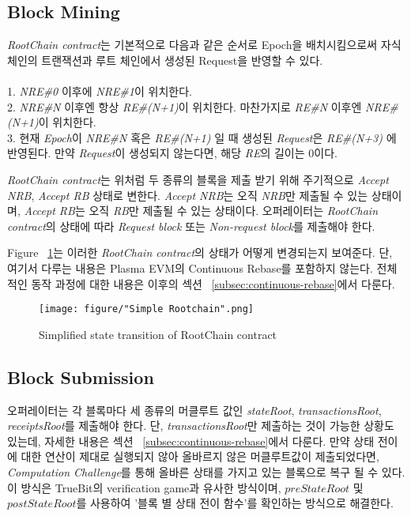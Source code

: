 \documentclass[letterpaper, 11pt]{article}
\begin{document}
\subsection{Block Mining} \label{subsec:blockmining}
\begin{CJK}{UTF8}{mj}
\emph{RootChain contract}는 기본적으로 다음과 같은 순서로 Epoch을 배치시킴으로써 자식 체인의 트랜잭션과 루트 체인에서 생성된 Request을 반영할 수 있다.\\
\\
1. \emph{NRE\#0} 이후에 \emph{NRE\#1}이 위치한다.\\
2. \emph{NRE\#N} 이후엔 항상 \emph{RE\#(N+1)}이 위치한다. 마찬가지로 \emph{RE\#N} 이후엔 \emph{NRE\#(N+1)}이 위치한다.\\
3. 현재 \emph{Epoch}이 \emph{NRE\#N} 혹은 \emph{RE\#(N+1)} 일 때 생성된 \emph{Request}은 \emph{RE\#(N+3)} 에 반영된다. 만약 \emph{Request}이 생성되지 않는다면, 해당 \emph{RE}의 길이는 0이다.

\bigskip

\emph{RootChain contract}는 위처럼 두 종류의 블록을 제출 받기 위해 주기적으로 \emph{Accept NRB}, \emph{Accept RB} 상태로 변한다. \emph{Accept NRB}는 오직 \emph{NRB}만 제출될 수 있는 상태이며, \emph{Accept RB}는 오직 \emph{RB}만 제출될 수 있는 상태이다. 오퍼레이터는 \emph{RootChain contract}의 상태에 따라 \emph{Request block} 또는 \emph{Non-request block}를 제출해야 한다.

Figure ~\ref{fig:simple-state-transition-diagram}는 이러한 \emph{RootChain contract}의 상태가 어떻게 변경되는지 보여준다. 단, 여기서 다루는 내용은 Plasma EVM의 Continuous Rebase를 포함하지 않는다. 전체적인 동작 과정에 대한 내용은 이후의 섹션 ~\ref{subsec:continuous-rebase}에서 다룬다.

\begin{figure}[!h]
\centering
\texttt{[image: figure/"Simple Rootchain".png]}
\caption{Simplified state transition of RootChain contract}
\label{fig:simple-state-transition-diagram}
\end{figure}

\end{CJK}

\subsection{Block Submission}
\begin{CJK}{UTF8}{mj}
오퍼레이터는 각 블록마다 세 종류의 머클루트 값인 \emph{stateRoot}, \emph{transactionsRoot}, \emph{receiptsRoot}를 제출해야 한다. 단, \emph{transactionsRoot}만 제출하는 것이 가능한 상황도 있는데, 자세한 내용은 섹션 ~\ref{subsec:continuous-rebase}에서 다룬다. 만약 상태 전이에 대한 연산이 제대로 실행되지 않아 올바르지 않은 머클루트값이 제출되었다면, \emph{Computation Challenge}를 통해 올바른 상태를 가지고 있는 블록으로 복구 될 수 있다. 이 방식은 TrueBit의 verification game과 유사한 방식이며, $preStateRoot$ 및 $postStateRoot$를 사용하여 '블록 별 상태 전이 함수'를 확인하는 방식으로 해결한다.
\end{CJK}
\end{document}
